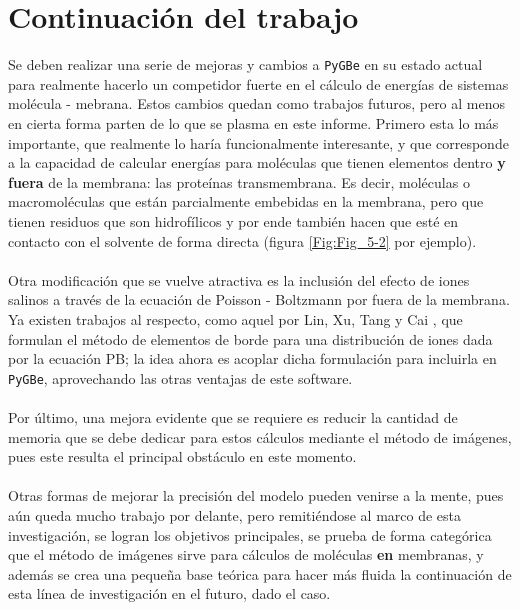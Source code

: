 \documentclass[12pt, twoside, onehalfspace, numbers, spanish]{ezthesis}
\numberwithin{equation}{section}
\begin{document}
\section{Continuación del trabajo}
Se deben realizar una serie de mejoras y cambios a \texttt{PyGBe} en su estado actual para realmente hacerlo un competidor fuerte en el cálculo de energías de sistemas molécula - mebrana. Estos cambios quedan como trabajos futuros, pero al menos en cierta forma parten de lo que se plasma en este informe. Primero esta lo más importante, que realmente lo haría funcionalmente interesante, y que corresponde a la capacidad de calcular energías para moléculas que tienen elementos dentro \textbf{y fuera} de la membrana: las proteínas transmembrana. Es decir, moléculas o macromoléculas que están parcialmente embebidas en la membrana, pero que tienen residuos que son hidrofílicos y por ende también hacen que esté en contacto con el solvente de forma directa (figura \ref{Fig:Fig_5-2} por ejemplo).\\\\
Otra modificación que se vuelve atractiva es la inclusión del efecto de iones salinos a través de la ecuación de Poisson - Boltzmann por fuera de la membrana. Ya existen trabajos al respecto, como aquel por Lin, Xu, Tang y Cai \cite{Huimin-Lin}, que formulan el método de elementos de borde para una distribución de iones dada por la ecuación PB; la idea ahora es acoplar dicha formulación para incluirla en \texttt{PyGBe}, aprovechando las otras ventajas de este software.\\\\
Por último, una mejora evidente que se requiere es reducir la cantidad de memoria que se debe dedicar para estos cálculos mediante el método de imágenes, pues este resulta el principal obstáculo en este momento.\\\\
Otras formas de mejorar la precisión del modelo pueden venirse a la mente, pues aún queda mucho trabajo por delante, pero remitiéndose al marco de esta investigación, se logran los objetivos principales, se prueba de forma categórica que el método de imágenes sirve para cálculos de moléculas \textbf{en} membranas, y además se crea una pequeña base teórica para hacer más fluida la continuación de esta línea de investigación en el futuro, dado el caso.

\appendix


\pagebreak

\pagebreak

\pagebreak
\end{document}
